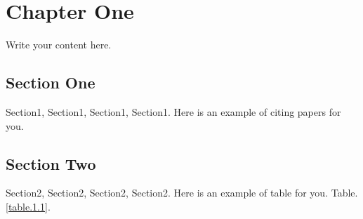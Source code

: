 \pagestyle{fancy}

\lhead{}
\chapter{Chapter One}\label{cp1}
\thispagestyle{fancy}


Write your content here.

\section{Section One}
Section1, Section1, Section1, Section1. Here is an example of citing papers for you\citep{lou2020Whole}.


\section{Section Two}
Section2, Section2, Section2, Section2. Here is an example of table for you. Table.\ref{table.1.1}.
\begin{table}[htbp]
	\centering
	\caption{DNA XOR operation}
	\label{table.1.1}%
\end{table}%